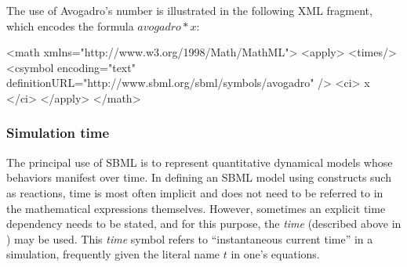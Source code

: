 The use of Avogadro's number is illustrated in the
following XML fragment, which encodes the formula $avogadro * x$:

\begin{example}
<math xmlns="http://www.w3.org/1998/Math/MathML">
    <apply>
        <times/>
        <csymbol encoding="text" definitionURL="http://www.sbml.org/sbml/symbols/avogadro" />
        <ci> x </ci>
    </apply>
</math>
\end{example}


\begin{example}
\end{example}


\subsubsection{Simulation time}
\label{sec:meaning-of-time}

The principal use of SBML is to represent quantitative dynamical
models whose behaviors manifest over time.  In defining an
SBML model using constructs such as reactions, time is most often
implicit and does not need to be referred to in the mathematical
expressions themselves.  However, sometimes an explicit time
dependency needs to be stated, and for this purpose, the
\emph{time}  (described above in
) may be used.  This \emph{time}
symbol refers to ``instantaneous current time'' in a simulation,
frequently given the literal name $t$ in one's equations.

